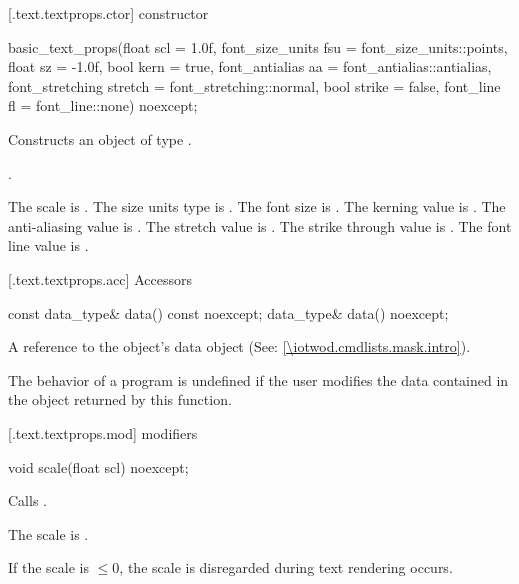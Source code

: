  [\iotwod.text.textprops.ctor] { constructor}

%
\begin{itemdecl}
basic_text_props(float scl = 1.0f,
  font_size_units fsu = font_size_units::points,
  float sz = -1.0f,
  bool kern = true,
  font_antialias aa = font_antialias::antialias,
  font_stretching stretch = font_stretching::normal,
  bool strike = false,
  font_line fl = font_line::none) noexcept;
\end{itemdecl}
\begin{itemdescr}
\pnum
\effects
Constructs an object of type .

\pnum
\postconditions {}.

\pnum
The scale is . The size units type is . The font size is . The kerning value is . The anti-aliasing value is . The stretch value is . The strike through value is . The font line value is .
\end{itemdescr}

 [\iotwod.text.textprops.acc] {Accessors}%

%
\begin{itemdecl}
const data_type& data() const noexcept;
data_type& data() noexcept;
\end{itemdecl}
\begin{itemdescr}
\pnum
\returns A reference to the  object's data object (See: \ref{\iotwod.cmdlists.mask.intro}).

\pnum
\remarks The behavior of a program is undefined if the user modifies the data contained in the  object returned by this function.
\end{itemdescr}

 [\iotwod.text.textprops.mod] { modifiers}

%
\begin{itemdecl}
void scale(float scl) noexcept;
\end{itemdecl}
\begin{itemdescr}
\pnum
\effects Calls .

\pnum
\remarks The scale is .

\pnum If the scale is $\leq 0$, the scale is disregarded during text rendering occurs.
\end{itemdescr}

